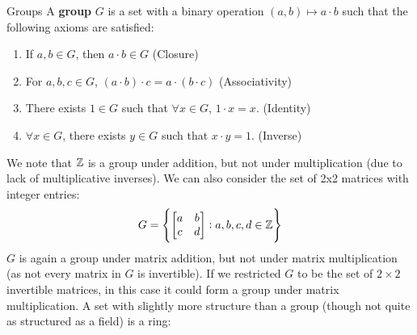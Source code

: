 \begin{ndef}{Groups}
A \textbf{group} $G$ is a set with a binary operation $(a,b) \mapsto a\cdot b$ such that the following axioms are satisfied:
\begin{enumerate}[start=1, label={(M\arabic*):}]
    \item If $a, b \in G$, then $a\cdot b \in G$ (Closure)
    \item For $a, b, c \in G$, $(a\cdot b)\cdot c = a\cdot(b\cdot c)$ (Associativity)
    \item There exists $1 \in G$ such that $\forall x \in G$, $1 \cdot x = x$. (Identity)
    \item $\forall x \in G$, there exists $y \in G$ such that $x \cdot y = 1$. (Inverse) 
\end{enumerate}
\end{ndef}
We note that $\mathbb{Z}$ is a group under addition, but not under multiplication (due to lack of multiplicative inverses). We can also consider the set of 2x2 matrices with integer entries:
\[G = \set{\begin{bmatrix} a & b \\ c & d \end{bmatrix}: a, b, c, d \in \mathbb{Z}}\]
$G$ is again a group under matrix addition, but not under matrix multiplication (as not every matrix in $G$ is invertible). If we restricted $G$ to be the set of $2\times 2$ invertible matrices, in this case it could form a group under matrix multiplication. A set with slightly more structure than a group (though not quite as structured as a field) is a ring:

